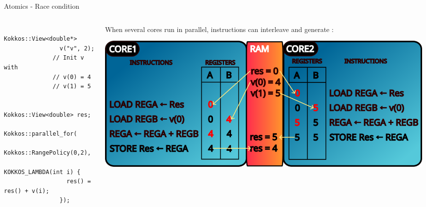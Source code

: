 \documentclass[
    aspectratio=169,
    handout,
]{beamer}
\begin{document}
%
%
%
%
%
%

\begin{frame}[fragile]{Atomics - Race condition}
    \begin{columns}
        \begin{column}{0.4\linewidth}
            \begin{verbatim}
              Kokkos::View<double*>
                v("v", 2);
              // Init v with
              // v(0) = 4
              // v(1) = 5

              Kokkos::View<double> res;
              Kokkos::parallel_for(
                Kokkos::RangePolicy(0,2),
                KOKKOS_LAMBDA(int i) {
                  res() = res() + v(i);
                });
            \end{verbatim}
        \end{column}
        \begin{column}{0.6\linewidth}
          When several cores run in parallel, instructions can interleave and generate :

          \includegraphics[width=1\textwidth]{race_condition2.png}
        \end{column}
    \end{columns}
\end{frame}
\end{document}
